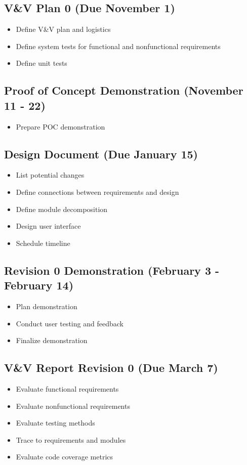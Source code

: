 \documentclass{article}
\begin{document}
	\subsection*{V\&V Plan 0 (Due November 1)}
	\begin{itemize}
		\item Define V\&V plan and logistics
		\item Define system tests for functional and nonfunctional requirements
		\item Define unit tests
	\end{itemize}

	\subsection*{Proof of Concept Demonstration (November 11 - 22)}
	\begin{itemize}
		\item Prepare POC demonstration
	\end{itemize}

	\subsection*{Design Document (Due January 15)}
	\begin{itemize}
		\item List potential changes
		\item Define connections between requirements and design
		\item Define module decomposition
		\item Design user interface
		\item Schedule timeline
	\end{itemize}

	\subsection*{Revision 0 Demonstration (February 3 - February 14)}
	\begin{itemize}
		\item Plan demonstration 
		\item Conduct user testing and feedback 
		\item Finalize demonstration
	\end{itemize}

	\subsection*{V\&V Report Revision 0 (Due March 7)}
	\begin{itemize}
		\item Evaluate functional requirements
		\item Evaluate nonfunctional requirements
		\item Evaluate testing methods
		\item Trace to requirements and modules
		\item Evaluate code coverage metrics
	\end{itemize}
\end{document}
